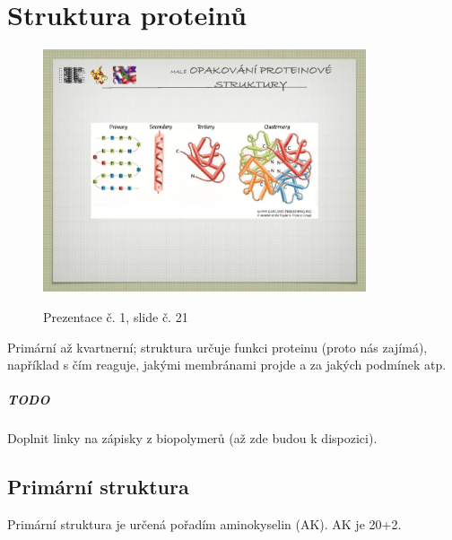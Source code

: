 \documentclass[DIV=8]{scrreprt}
\newcommand{\mybox}[2]{
    \paragraph{#1} #2
}
\begin{document}
\chapter{Struktura proteinů} \label{Struktura proteinů}


\begin{figure}
    \caption{Prezentace č. 1, slide č. 21}
    \includegraphics[width=0.85\textwidth]{slides-1/slide-21.jpg}
    \centering
    \label{slides-1-slide-21}
\end{figure}

Primární až kvartnerní; struktura určuje funkci proteinu (proto nás zajímá), například s čím reaguje, jakými membránami projde a za jakých podmínek atp.

\mybox{TODO}{Doplnit linky na zápisky z biopolymerů (až zde budou k dispozici).}


\section{Primární struktura} \label{Primární struktura}


Primární struktura je určená pořadím aminokyselin (AK). AK je 20+2.
\end{document}
